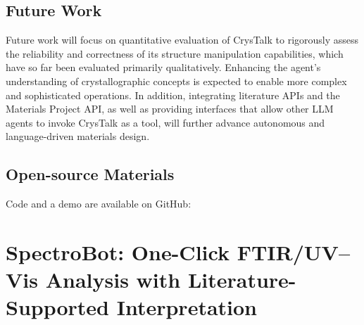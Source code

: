 
\subsection*{Future Work}

Future work will focus on quantitative evaluation of CrysTalk to rigorously assess the reliability and correctness of its structure manipulation capabilities, which have so far been evaluated primarily qualitatively. Enhancing the agent’s understanding of crystallographic concepts is expected to enable more complex and sophisticated operations. In addition, integrating literature APIs and the Materials Project API, as well as providing interfaces that allow other LLM agents to invoke CrysTalk as a tool, will further advance autonomous and language-driven materials design.

\subsection*{Open-source Materials}
Code and a demo are available on GitHub: 








\section{SpectroBot: One-Click FTIR/UV--Vis Analysis with Literature-Supported Interpretation}

